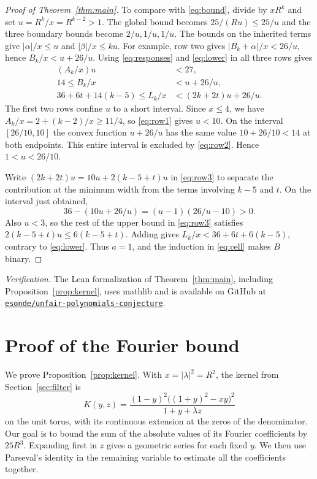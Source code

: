 \documentclass[11pt,reqno]{amsart}
\begin{document}
\begin{proof}[Proof of Theorem~\ref{thm:main}]
To compare with \eqref{eq:bound}, divide by \(xR^k\) and set \(u=R^k/x=R^{k-2}>1\). The global bound becomes \(25/(Ru)\le25/u\) and the three boundary bounds become \(2/u,1/u,1/u\). The bounds on the inherited terms give \(|\alpha|/x\le u\) and \(|\beta|/x\le ku\). For example, row two gives \(|B_k+\alpha|/x<26/u\), hence \(B_k/x<u+26/u\). Using \eqref{eq:responses} and \eqref{eq:lower} in all three rows gives
\begin{align}
 (A_k/x)u &<27, \label{eq:row1}\\
 14\le B_k/x &<u+26/u, \label{eq:row2}\\
 36+6t+14(k-5)\le L_k/x &<(2k+2t)u+26/u. \label{eq:row3}
\end{align}
The first two rows confine \(u\) to a short interval. Since \(x\le4\), we have \(A_k/x=2+(k-2)/x\ge 11/4\), so \eqref{eq:row1} gives \(u<10\). On the interval \([26/10,10]\) the convex function \(u+26/u\) has the same value \(10+26/10<14\) at both endpoints. This entire interval is excluded by \eqref{eq:row2}. Hence \(1<u<26/10\).

Write \((2k+2t)u=10u+2(k-5+t)u\) in \eqref{eq:row3} to separate the contribution at the minimum width from the terms involving \(k-5\) and \(t\). On the interval just obtained,
\[
 36-(10u+26/u)=(u-1)(26/u-10)>0 .
\]
Also \(u<3\), so the rest of the upper bound in \eqref{eq:row3} satisfies \(2(k-5+t)u\le6(k-5+t)\). Adding gives \(L_k/x<36+6t+6(k-5)\), contrary to \eqref{eq:lower}. Thus \(a=1\), and the induction in \eqref{eq:cell} makes \(B\) binary.
\end{proof}

\smallskip\noindent\textit{Verification.} The Lean formalization of Theorem~\ref{thm:main}, including Proposition~\ref{prop:kernel}, uses mathlib and is available on GitHub at \href{https://github.com/esonde/unfair-polynomials-conjecture}{\texttt{esonde/unfair-polynomials-conjecture}}.

\appendix
\section{Proof of the Fourier bound}\label{app:fourier}

We prove Proposition~\ref{prop:kernel}. With \(x=|\lambda|^2=R^2\), the kernel from Section~\ref{sec:filter} is
\[
 K(y,z)=\frac{(1-y)^2\big((1+y)^2-xy\big)^2}{1+y+\lambda z}
\]
on the unit torus, with its continuous extension at the zeros of the denominator. Our goal is to bound the sum of the absolute values of its Fourier coefficients by \(25R^3\). Expanding first in \(z\) gives a geometric series for each fixed \(y\). We then use Parseval's identity in the remaining variable to estimate all the coefficients together.
\end{document}
